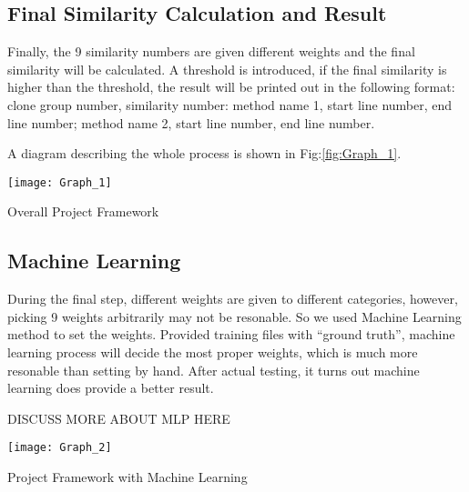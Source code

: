 \documentclass[../main.tex]{subfiles}
\begin{document}
\subsection{Final Similarity Calculation and Result}

Finally, the 9 similarity numbers are given different weights and the final similarity will be calculated. A threshold is introduced, if the final similarity is higher than the threshold, the result will be printed out in the following format: clone group number, similarity number: method name 1, start line number, end line number; method name 2, start line number, end line number.

A diagram describing the whole process is shown in Fig:\ref{fig:Graph_1}.\\

\begin{figurehere}
\centering \texttt{[image: Graph\_1]} 
\caption{Overall Project Framework} \label{fig:Graph_1}
\end{figurehere}

\subsection{Machine Learning}

During the final step, different weights are given to different categories, however, picking 9 weights arbitrarily may not be resonable. So we used Machine Learning method to set the weights. Provided training files with ``ground truth'', machine learning process will decide the most proper weights, which is much more resonable than setting by hand. After actual testing, it turns out machine learning does provide a better result.

DISCUSS MORE ABOUT MLP HERE\\

\begin{figurehere}
\centering \texttt{[image: Graph\_2]} 
\caption{Project Framework with Machine Learning} \label{fig:Graph_2}
\end{figurehere}
\end{document}
